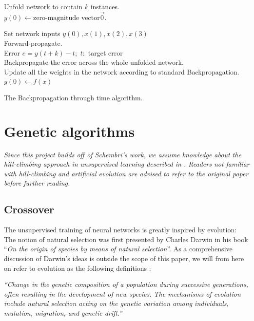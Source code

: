 \documentclass[10pt,a4paper,DIV=11]{scrreprt}
\begin{document}
\begin{algorithm}[H]
\LinesNumbered
\DontPrintSemicolon
\BlankLine
{}
\BlankLine
\Begin
{
    Unfold network to contain $k$ instances.\\
    $y(0) \leftarrow \text{zero-magnitude vector} \overrightarrow{0}$.
    
    {
        Set network inputs $y(0), x(1), x(2), x(3)$\\
        Forward-propagate.\\ 
        Error $e = y(t+k) - t;$ $t:$ target error\\
        Backpropagate the error across the whole unfolded network.\\
        Update all the weights in the network according to standard Backpropagation.\\
        $y(0) \leftarrow f(x)$

    
    }
}
\caption{The Backpropagation through time algorithm.}
\label{alg:BTT}
\end{algorithm}

\section{Genetic algorithms}
\textit{Since this project builds off of Schembri's work, we assume knowledge about the hill-climbing approach in unsupervised learning described in 
\cite{DANIEL}. Readers not familiar with hill-climbing and artificial evolution are advised to refer to the original paper before further reading.} 

\subsection{Crossover}
The unsupervised training of neural networks is greatly inspired by evolution: The notion of natural selection was first presented by Charles Darwin 
in his book “\textit{On the origin of species by means of natural selection}”\cite{DARWIN}. As a comprehensive discussion of Darwin's ideas is 
outside the scope of this paper, we will from here on refer to evolution as the following definitions \cite{OXFORD}:

\begin{center}
\textit{“Change in the genetic composition of a population during successive generations, often resulting in the development of new species. 
The mechanisms of evolution include natural selection acting on the genetic variation among individuals, mutation, migration, and genetic drift.”}\\
\end{center}
\end{document}
